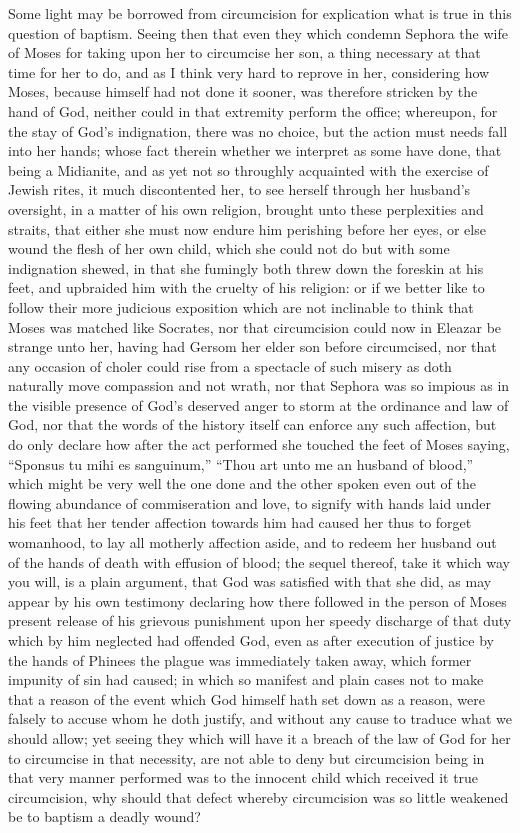 Some light may be borrowed from circumcision for explication what is true in this question of baptism. Seeing then that even they which condemn Sephora the wife of Moses for taking upon her to circumcise her son, a thing necessary at that time for her to do, and as I think very hard to reprove in her, considering how Moses, because himself had not done it sooner, was therefore stricken by the hand of God, neither could in that extremity perform the office; whereupon, for the stay of God’s indignation, there was no choice, but the action must needs fall into her hands; whose fact therein whether we interpret as some have done, that being a Midianite, and as yet not so throughly acquainted with the exercise of Jewish rites, it much discontented her, to see herself through her husband’s oversight, in a matter of his own religion, brought unto these perplexities and straits, that either she must now endure him perishing before her eyes, or else wound the flesh of her own child, which she could not do but with some indignation shewed, in that she fumingly both threw down the foreskin at his feet, and upbraided him with the cruelty of his religion: or if we better like to follow their more judicious  exposition which are not inclinable to think that Moses was matched like Socrates, nor that circumcision could now in Eleazar be strange unto her, having had Gersom her elder son before circumcised, nor that any occasion of choler could rise from a spectacle of such misery as doth naturally move compassion and not wrath, nor that Sephora was so impious as in the visible presence of God’s deserved anger to storm at the ordinance and law of God, nor that the words of the history itself can enforce any such affection, but do only declare how after the act performed she touched the feet of Moses saying, “Sponsus tu mihi es sanguinum,” “Thou art unto me an husband of blood,” which might be very well the one done and the other spoken even out of the flowing abundance of commiseration and love, to signify with hands laid under his feet that her tender affection towards him had caused her thus to forget womanhood, to lay all motherly affection aside, and to redeem her husband out of the hands of death with effusion of blood; the sequel thereof, take it which way you will, is a plain argument, that God was satisfied with that she did, as may appear by his own testimony declaring how there followed in the person of Moses present release of  his grievous punishment upon her speedy discharge of that duty which by him neglected had offended God, even as after execution of justice by the hands of Phinees the plague was immediately taken away, which former impunity of sin had caused; in which so manifest and plain cases not to make that a reason of the event which God himself hath set down as a reason, were falsely to accuse whom he doth justify, and without any cause to traduce what we should allow; yet seeing they which will have it a breach of the law of God for her to circumcise in that necessity, are not able to deny but circumcision being in that very manner performed was to the innocent child which received it true circumcision, why should that defect whereby circumcision was so little weakened be to baptism a deadly wound?
